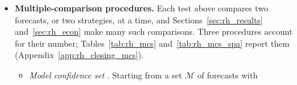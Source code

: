 \begin{itemize}
\begin{itemize}
  \end{itemize}

\item \textbf{Multiple-comparison procedures.} Each test above compares two forecasts, or two strategies, at a time,
  and Sections~\ref{sec:rh_results} and~\ref{sec:rh_econ} make many such comparisons. Three procedures account for
  their number; Tables~\ref{tab:rh_mcs} and~\ref{tab:rh_mcs_spa} report them (Appendix~\ref{app:rh_closing_mcs}).
  \begin{itemize}
  \item \emph{Model confidence set} \citep{HansenLundeNason2011}. Starting from a set $\mathcal M$ of forecasts with

\end{itemize}
\end{itemize}
